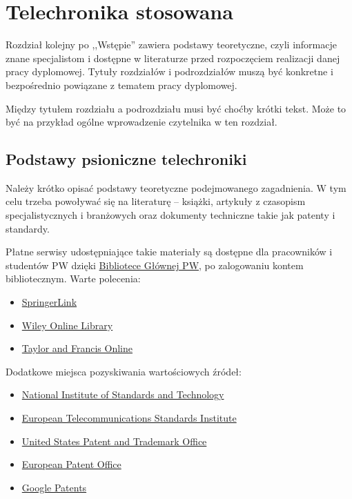 \chapter{Telechronika stosowana}

Rozdział kolejny po ,,Wstępie'' zawiera podstawy teoretyczne, czyli informacje znane specjalistom i dostępne w literaturze przed rozpoczęciem realizacji danej pracy dyplomowej. Tytuły rozdziałów i podrozdziałów muszą być konkretne i bezpośrednio powiązane z tematem pracy dyplomowej.

Między tytułem rozdziału a podrozdziału musi być choćby krótki tekst. Może to być na przykład ogólne wprowadzenie czytelnika w ten rozdział.

\section{Podstawy psioniczne telechroniki}

Należy krótko opisać podstawy teoretyczne podejmowanego zagadnienia. W tym celu trzeba powoływać się na literaturę -- książki, artykuły z czasopism specjalistycznych i branżowych oraz dokumenty techniczne takie jak patenty i standardy.

Płatne serwisy udostępniające takie materiały są dostępne dla pracowników i studentów PW dzięki \href{https://bg.pw.edu.pl/}{Bibliotece Głównej PW}, po zalogowaniu kontem bibliotecznym. Warte polecenia:

\begin{itemize}
	\item \href{http://eczyt.bg.pw.edu.pl/han/SpringerLink}{SpringerLink}
	\item \href{http://eczyt.bg.pw.edu.pl/han/Wiley}{Wiley Online Library}
	\item \href{http://eczyt.bg.pw.edu.pl/han/TaylorandFrancis}{Taylor and Francis Online}
\end{itemize}

Dodatkowe miejsca pozyskiwania wartościowych źródeł:

\begin{itemize}
	\item \href{https://www.nist.gov/}{National Institute of Standards and Technology}
	\item \href{https://www.etsi.org/}{European Telecommunications Standards Institute}
	\item \href{https://www.uspto.gov/}{United States Patent and Trademark Office}
	\item \href{https://www.epo.org/en}{European Patent Office}
	\item \href{https://patents.google.com/}{Google Patents}
\end{itemize}

